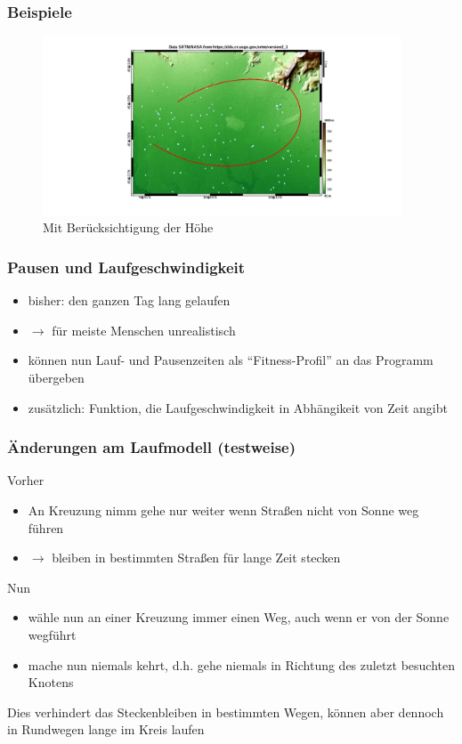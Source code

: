 \documentclass[aspectratio=43]{beamer}
\begin{document}
\begin{frame}
    \frametitle{Beispiele}
    \begin{figure}[t]
        \centering
        \includegraphics[width=0.95\textwidth]{bilder/nostreetele.jpg}
        \caption{Mit Berücksichtigung der Höhe}
    \end{figure}
\end{frame}

\begin{frame}
    \frametitle{Pausen und Laufgeschwindigkeit}
    \begin{itemize}
        \item bisher: den ganzen Tag lang gelaufen
        \item[] $\rightarrow$ für meiste Menschen unrealistisch
        \item können nun Lauf- und Pausenzeiten als \enquote{Fitness-Profil} an das Programm übergeben
        \item zusätzlich: Funktion, die Laufgeschwindigkeit in Abhängikeit von Zeit angibt
    \end{itemize}
\end{frame}

\begin{frame}
    \frametitle{Änderungen am Laufmodell (testweise)}
    Vorher
    \begin{itemize}
        \item An Kreuzung nimm gehe nur weiter wenn Straßen nicht von Sonne weg führen
        \item[] $\rightarrow$ bleiben in bestimmten Straßen für lange Zeit stecken
    \end{itemize}
    Nun
    \begin{itemize}
        \item wähle nun an einer Kreuzung immer einen Weg, auch wenn er von der Sonne
            wegführt
        \item mache nun niemals kehrt, d.h. gehe niemals in Richtung des zuletzt besuchten
            Knotens
    \end{itemize}
    Dies verhindert das Steckenbleiben in bestimmten Wegen, können aber dennoch in
    Rundwegen lange im Kreis laufen
\end{frame}
\end{document}

